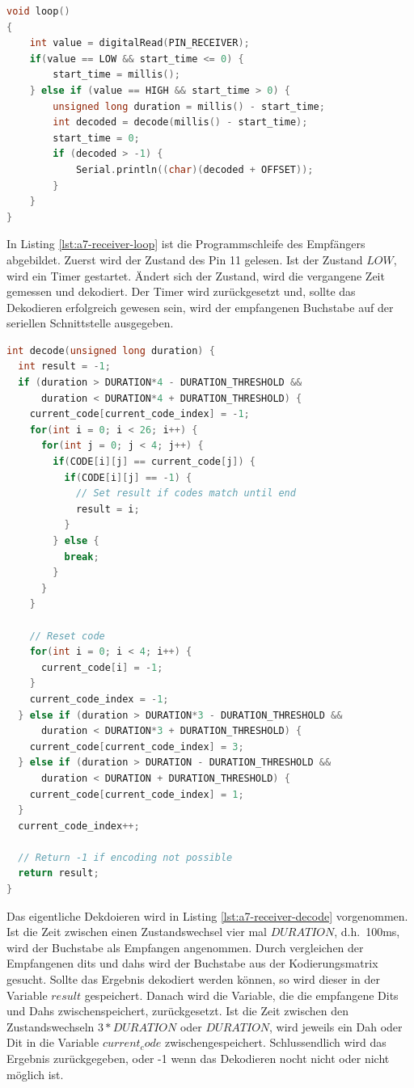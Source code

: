 \begin{lstlisting}[language=C,label={lst:a7-receiver-loop}, caption={Programmschleife des Empfängers}]
void loop()
{
    int value = digitalRead(PIN_RECEIVER);
    if(value == LOW && start_time <= 0) {
        start_time = millis();
    } else if (value == HIGH && start_time > 0) {
        unsigned long duration = millis() - start_time;
        int decoded = decode(millis() - start_time);
        start_time = 0;
        if (decoded > -1) {
            Serial.println((char)(decoded + OFFSET));
        }
    }
}
\end{lstlisting}

In Listing \ref{lst:a7-receiver-loop} ist die Programmschleife des Empfängers abgebildet.
Zuerst wird der Zustand des Pin 11 gelesen.
Ist der Zustand $LOW$, wird ein Timer gestartet.
Ändert sich der Zustand, wird die vergangene Zeit gemessen und dekodiert.
Der Timer wird zurückgesetzt und, sollte das Dekodieren erfolgreich gewesen sein, wird der empfangenen Buchstabe auf der seriellen Schnittstelle ausgegeben.

\newpage

\begin{lstlisting}[language=C,label={lst:a7-receiver-decode}, caption={Dekodieren empfangenen Daten}]
int decode(unsigned long duration) {
  int result = -1;
  if (duration > DURATION*4 - DURATION_THRESHOLD &&
      duration < DURATION*4 + DURATION_THRESHOLD) {
    current_code[current_code_index] = -1;
    for(int i = 0; i < 26; i++) {
      for(int j = 0; j < 4; j++) {
        if(CODE[i][j] == current_code[j]) {
          if(CODE[i][j] == -1) {
            // Set result if codes match until end
            result = i;
          }
        } else {
          break;
        }
      }
    }

    // Reset code
    for(int i = 0; i < 4; i++) {
      current_code[i] = -1;
    }
    current_code_index = -1;
  } else if (duration > DURATION*3 - DURATION_THRESHOLD &&
      duration < DURATION*3 + DURATION_THRESHOLD) {
    current_code[current_code_index] = 3;
  } else if (duration > DURATION - DURATION_THRESHOLD &&
      duration < DURATION + DURATION_THRESHOLD) {
    current_code[current_code_index] = 1;
  }
  current_code_index++;

  // Return -1 if encoding not possible
  return result;
}
\end{lstlisting}

\newpage

Das eigentliche Dekdoieren wird in Listing \ref{lst:a7-receiver-decode} vorgenommen.
Ist die Zeit zwischen einen Zustandswechsel vier mal $DURATION$, d.h.\ 100ms, wird der Buchstabe als Empfangen angenommen.
Durch vergleichen der Empfangenen dits und dahs wird der Buchstabe aus der Kodierungsmatrix gesucht.
Sollte das Ergebnis dekodiert werden können, so wird dieser in der Variable $result$ gespeichert.
Danach wird die Variable, die die empfangene Dits und Dahs zwischenspeichert, zurückgesetzt.
Ist die Zeit zwischen den Zustandswechseln $3*DURATION$ oder $DURATION$, wird jeweils ein Dah oder Dit in die Variable $current_code$ zwischengespeichert.
Schlussendlich wird das Ergebnis zurückgegeben, oder -1 wenn das Dekodieren nocht nicht oder nicht möglich ist.


